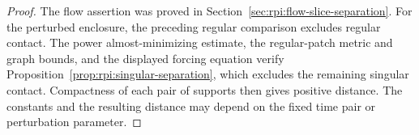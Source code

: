 \begin{proof}
The flow assertion was proved in
Section~\ref{sec:rpi:flow-slice-separation}. For the perturbed
enclosure, the preceding regular comparison excludes regular
contact. The power almost-minimizing estimate, the regular-patch
metric and graph bounds, and the displayed forcing equation verify
Proposition~\ref{prop:rpi:singular-separation}, which excludes the
remaining singular contact. Compactness of each pair of supports
then gives positive distance. The constants and the resulting
distance may depend on the fixed time pair or perturbation parameter.
\end{proof}
